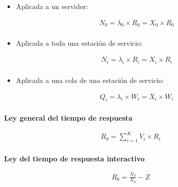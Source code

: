 \documentclass[a4paper,12pt]{article}
\begin{document}
\begin{itemize}
    \item Aplicada a un servidor:
    
    \begin{tcolorbox}[colback=yellow!5!white, colframe=yellow!75!black]
        \begin{align*}
            N_0 = \lambda_0 \times R_0 = X_0 \times R_0 \\
        \end{align*}
    \end{tcolorbox}
    \item Aplicada a toda una estación de servicio:
    \begin{tcolorbox}[colback=yellow!5!white, colframe=yellow!75!black]
        \begin{align*}
            N_i = \lambda_i \times R_i = X_i \times R_i \\
        \end{align*}
    \end{tcolorbox}
    \item Aplicada a una cola de una estación de servicio:
    \begin{tcolorbox}[colback=yellow!5!white, colframe=yellow!75!black]
        \begin{align*}
            Q_i = \lambda_i \times W_i = X_i \times W_i \\
        \end{align*}
    \end{tcolorbox}
\end{itemize}

\textbf{Ley general del tiempo de respuesta}

\begin{tcolorbox}[colback=yellow!5!white, colframe=yellow!75!black]
    \begin{align*}
        R_0 = \sum_{i=1}^{K} V_i \times R_i \\ 
    \end{align*}
\end{tcolorbox}


\textbf{Ley del tiempo de respuesta interactivo}

\begin{tcolorbox}[colback=yellow!5!white, colframe=yellow!75!black]
    \begin{align*}
        R_0 = \frac{N_T}{X_0} - Z \\
    \end{align*}
\end{tcolorbox}
\end{document}
